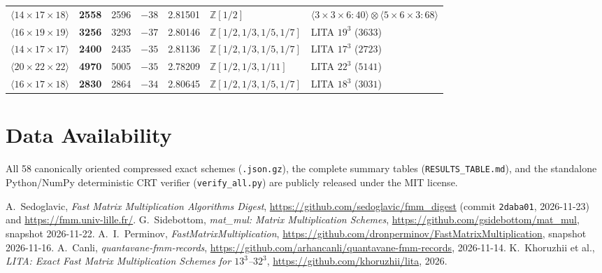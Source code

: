 \documentclass[11pt,a4paper]{article}
\begin{document}
\begin{table}[ht]
\begin{tabular}{@{}lrrrrll@{}}
$\langle 14\times 17\times 18\rangle$ & \textbf{2558} & 2596 & $-38$ & 2.81501 & $\mathbb{Z}[1/2]$ & $\langle 3\times 3\times 6:40\rangle \otimes \langle 5\times 6\times 3:68\rangle$ \\
$\langle 16\times 19\times 19\rangle$ & \textbf{3256} & 3293 & $-37$ & 2.80146 & $\mathbb{Z}[1/2,1/3,1/5,1/7]$ & LITA $19^3$ ($3633$) \\
$\langle 14\times 17\times 17\rangle$ & \textbf{2400} & 2435 & $-35$ & 2.81136 & $\mathbb{Z}[1/2,1/3,1/5,1/7]$ & LITA $17^3$ ($2723$) \\
$\langle 20\times 22\times 22\rangle$ & \textbf{4970} & 5005 & $-35$ & 2.78209 & $\mathbb{Z}[1/2,1/3,1/11]$ & LITA $22^3$ ($5141$) \\
$\langle 16\times 17\times 18\rangle$ & \textbf{2830} & 2864 & $-34$ & 2.80645 & $\mathbb{Z}[1/2,1/3,1/5,1/7]$ & LITA $18^3$ ($3031$) \\
\bottomrule
\end{tabular}
\end{table}

\section{Data Availability}
All 58 canonically oriented compressed exact schemes (\texttt{.json.gz}), the complete summary tables (\texttt{RESULTS\_TABLE.md}), and the standalone Python/NumPy deterministic CRT verifier (\texttt{verify\_all.py}) are publicly released under the MIT license.

\begin{thebibliography}{9}
A.~Sedoglavic, \emph{Fast Matrix Multiplication Algorithms Digest}, \url{https://github.com/sedoglavic/fmm_digest} (commit \texttt{2daba01}, 2026-11-23) and \url{https://fmm.univ-lille.fr/}.
G.~Sidebottom, \emph{mat\_mul: Matrix Multiplication Schemes}, \url{https://github.com/gsidebottom/mat_mul}, snapshot 2026-11-22.
A.~I.~Perminov, \emph{FastMatrixMultiplication}, \url{https://github.com/dronperminov/FastMatrixMultiplication}, snapshot 2026-11-16.
A.~Canli, \emph{quantavane-fmm-records}, \url{https://github.com/arhancanli/quantavane-fmm-records}, 2026-11-14.
K.~Khoruzhii et al., \emph{LITA: Exact Fast Matrix Multiplication Schemes for $13^3$--$32^3$}, \url{https://github.com/khoruzhii/lita}, 2026.
\end{thebibliography}
\end{document}
